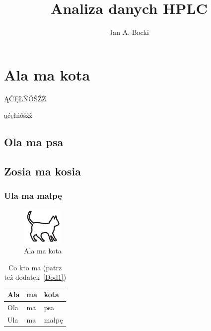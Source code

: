 \documentclass[magister,druk,ramka,polski]{dyplom}
\author{Jan A. Backi}
\title{Analiza danych HPLC}
\begin{document}
\maketitle

\tableofcontents

\listoffigures

\listoftables





\chapter{Ala ma kota}

ĄĆĘŁŃÓŚŹŻ

ąćęłńóśźż

\lipsum[1]

\section{Ola ma psa}

\lipsum[2-3]

\section{Zosia ma kosia}

\lipsum[7]

\subsection{Ula ma małpę}

\lipsum[4-10]

\begin{figure}
\includegraphics[width=.4\textwidth]{kotek}
\caption{Ala ma kota}
\end{figure}

\lipsum[11-15]

\begin{table}
\caption{Co kto ma \cite{harel_rzecz_2008} (patrz też dodatek~\ref{Dod1})}
\begin{tabular}{|l|l|l|}
\hline
Ala & ma & kota \\
\hline
Ola & ma & psa \\
\hline
Ula & ma & małpę\\
\hline
\end{tabular}
\end{table}
\end{document}
